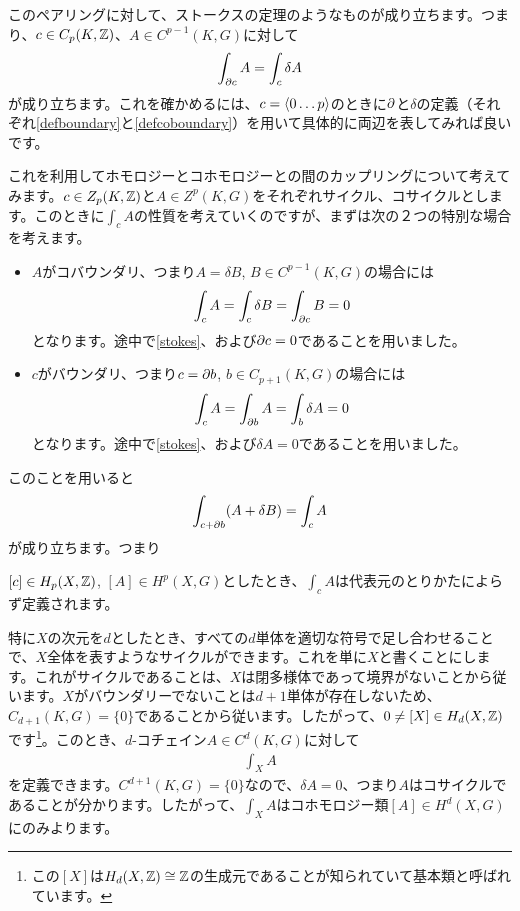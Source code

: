 \documentclass[generalized_symmetry.tex]{subfiles}
\begin{document}
このペアリングに対して、ストークスの定理のようなものが成り立ちます。つまり、$c \in C_p(K,\mathbb{Z})$、$A \in C^{p-1}(K,G)$に対して
\begin{align}
    \int_{\partial c} A = \int_{c} \delta A \label{stokes}
\end{align}
が成り立ちます。これを確かめるには、$c=\expval{0\dots p}$のときに$\partial$と$\delta$の定義（それぞれ\eqref{defboundary}と\eqref{defcoboundary}）を用いて具体的に両辺を表してみれば良いです。

これを利用してホモロジーとコホモロジーとの間のカップリングについて考えてみます。$c \in Z_p(K,\mathbb{Z})$と$A \in Z^p(K,G)$をそれぞれサイクル、コサイクルとします。このときに$\int_{c}A$の性質を考えていくのですが、まずは次の２つの特別な場合を考えます。
\begin{itemize}
    \item $A$がコバウンダリ、つまり$A=\delta B$, $B \in C^{p-1}(K,G)$の場合には
\begin{align}
    \int_c A =\int_c \delta B = \int_{\partial c} B =0
\end{align}
となります。途中で\eqref{stokes}、および$\partial c=0$であることを用いました。
    \item $c$がバウンダリ、つまり$c=\partial b$, $b \in C_{p+1}(K,G)$の場合には
\begin{align}
    \int_c A =\int_{\partial b} A = \int_{b} \delta A =0
\end{align}
となります。途中で\eqref{stokes}、および$\delta A=0$であることを用いました。
\end{itemize}
このことを用いると
\begin{align}
    \int_{c+\partial b}(A+\delta B) = \int_c A
\end{align}
が成り立ちます。つまり
\begin{emphasize}
    $[c] \in H_p(X,\mathbb{Z})$, $[A] \in H^p(X,G)$としたとき、$\int_{c}A$は代表元のとりかたによらず定義されます。
\end{emphasize}

特に$X$の次元を$d$としたとき、すべての$d$単体を適切な符号で足し合わせることで、$X$全体を表すようなサイクルができます。これを単に$X$と書くことにします。これがサイクルであることは、$X$は閉多様体であって境界がないことから従います。$X$がバウンダリーでないことは$d+1$単体が存在しないため、$C_{d+1}(K,G)=\{0\}$であることから従います。したがって、$0\ne[X] \in H_d(X,\mathbb{Z})$です\footnote{この$[X]$は$H_d(X,\mathbb{Z})\cong \mathbb{Z}$の生成元であることが知られていて基本類と呼ばれています。}。このとき、$d$-コチェイン$A\in C^d(K,G)$に対して
\begin{align}
    \int_{X}A
\end{align}
を定義できます。$C^{d+1}(K,G)=\{0\}$なので、$\delta A=0$、つまり$A$はコサイクルであることが分かります。したがって、$\int_{X}A$はコホモロジー類$[A] \in H^d(X,G)$にのみよります。
\end{document}
